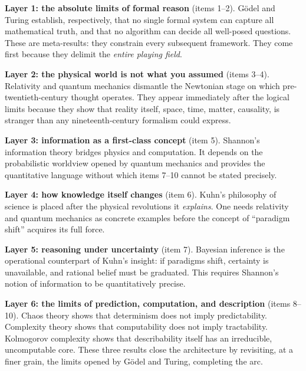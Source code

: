 \documentclass[11pt,a4paper]{article}
\begin{document}
	\textbf{Layer 1: the absolute limits of formal reason} (items 1--2).
	G\"odel and Turing establish, respectively, that no single formal system
	can capture all mathematical truth, and that no algorithm can decide
	all well-posed questions. These are meta-results: they constrain every
	subsequent framework. They come first because they delimit the
	\emph{entire playing field}.
	
	\textbf{Layer 2: the physical world is not what you assumed} (items
	3--4). Relativity and quantum mechanics dismantle the Newtonian stage on
	which pre-twentieth-century thought operates. They appear immediately
	after the logical limits because they show that reality
	itself, space, time, matter, causality, is stranger than any
	nineteenth-century formalism could express.
	
	\textbf{Layer 3: information as a first-class concept} (item 5).
	Shannon's information theory bridges physics and computation. It
	depends on the probabilistic worldview opened by quantum mechanics and
	provides the quantitative language without which items 7--10 cannot be
	stated precisely.
	
	\textbf{Layer 4: how knowledge itself changes} (item 6). Kuhn's
	philosophy of science is placed after the physical revolutions it
	\emph{explains}. One needs relativity and quantum mechanics as concrete
	examples before the concept of ``paradigm shift'' acquires its full
	force.
	
	\textbf{Layer 5: reasoning under uncertainty} (item 7). Bayesian
	inference is the operational counterpart of Kuhn's insight: if
	paradigms shift, certainty is unavailable, and rational belief must be
	graduated. This requires Shannon's notion of information to be
	quantitatively precise.
	
	\textbf{Layer 6: the limits of prediction, computation, and
		description} (items 8--10). Chaos theory shows that determinism does
	not imply predictability. Complexity theory shows that computability
	does not imply tractability. Kolmogorov complexity shows that
	describability itself has an irreducible, uncomputable core. These
	three results close the architecture by revisiting, at a finer grain,
	the limits opened by G\"odel and Turing, completing the arc.
	
	\vspace{0.5em}
	\noindent{\color{accent}\rule{\textwidth}{0.6pt}}
	
	\newpage
	
	
\end{document}
